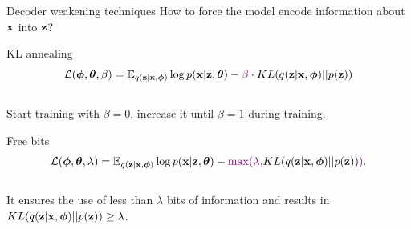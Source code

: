 \documentclass{beamer}
\begin{document}
\begin{frame}{Decoder weakening techniques}
	How to force the model encode information about $\mathbf{x}$ into $\mathbf{z}$?
	\begin{block}{KL annealing}
		\vspace{-0.3cm}
		\[
		    \mathcal{L}(\boldsymbol{\phi}, \boldsymbol{\theta}, \beta) = \mathbb{E}_{q(\mathbf{z} | \mathbf{x}, \boldsymbol{\phi})} \log p(\mathbf{x} | \mathbf{z}, \boldsymbol{\theta}) - {\color{violet}\beta} \cdot KL (q(\mathbf{z} | \mathbf{x}, \boldsymbol{\phi}) || p(\mathbf{z}))
		\]
		\vspace{-0.3cm} \\
		Start training with $\beta = 0$, increase it until $\beta = 1$ during training.
	\end{block}
	\begin{block}{Free bits}
		\vspace{-0.3cm}
		\[
		    \mathcal{L}(\boldsymbol{\phi}, \boldsymbol{\theta}, \lambda) = \mathbb{E}_{q(\mathbf{z} | \mathbf{x}, \boldsymbol{\phi})} \log p(\mathbf{x} | \mathbf{z}, \boldsymbol{\theta}) - {\color{violet}\max(\lambda,} KL (q(\mathbf{z} | \mathbf{x}, \boldsymbol{\phi}) || p(\mathbf{z})){\color{violet})}.
		\]
		\vspace{-0.3cm} \\
		It ensures the use of less than $\lambda$ bits of information and results in $KL (q(\mathbf{z} | \mathbf{x}, \boldsymbol{\phi}) || p(\mathbf{z})) \geq \lambda$.
	\end{block}
\end{frame}
\end{document}
